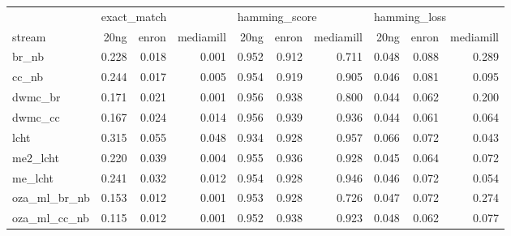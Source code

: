 \begin{tabular}{lrrrrrrrrr}
	\toprule
	                & \multicolumn{3}{l}{exact\_match} & \multicolumn{3}{l}{hamming\_score} & \multicolumn{3}{l}{hamming\_loss}                                                         \\
	stream          & 20ng                             & enron                              & mediamill                         & 20ng  & enron & mediamill & 20ng  & enron & mediamill \\
	\midrule
	br\_nb          & 0.228                            & 0.018                              & 0.001                             & 0.952 & 0.912 & 0.711     & 0.048 & 0.088 & 0.289     \\
	cc\_nb          & 0.244                            & 0.017                              & 0.005                             & 0.954 & 0.919 & 0.905     & 0.046 & 0.081 & 0.095     \\
	dwmc\_br        & 0.171                            & 0.021                              & 0.001                             & 0.956 & 0.938 & 0.800     & 0.044 & 0.062 & 0.200     \\
	dwmc\_cc        & 0.167                            & 0.024                              & 0.014                             & 0.956 & 0.939 & 0.936     & 0.044 & 0.061 & 0.064     \\
	lcht            & 0.315                            & 0.055                              & 0.048                             & 0.934 & 0.928 & 0.957     & 0.066 & 0.072 & 0.043     \\
	me2\_lcht       & 0.220                            & 0.039                              & 0.004                             & 0.955 & 0.936 & 0.928     & 0.045 & 0.064 & 0.072     \\
	me\_lcht        & 0.241                            & 0.032                              & 0.012                             & 0.954 & 0.928 & 0.946     & 0.046 & 0.072 & 0.054     \\
	oza\_ml\_br\_nb & 0.153                            & 0.012                              & 0.001                             & 0.953 & 0.928 & 0.726     & 0.047 & 0.072 & 0.274     \\
	oza\_ml\_cc\_nb & 0.115                            & 0.012                              & 0.001                             & 0.952 & 0.938 & 0.923     & 0.048 & 0.062 & 0.077     \\
	\bottomrule
\end{tabular}

